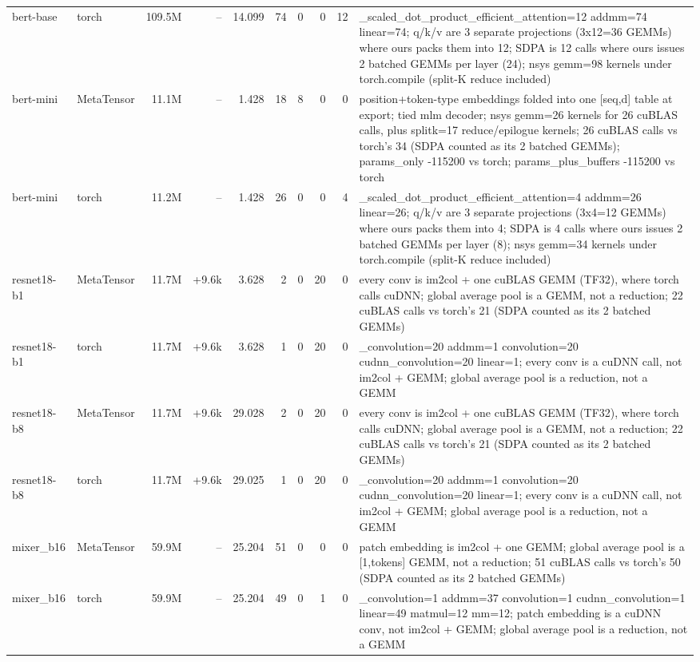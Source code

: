 \begin{tabular}{llrrrrrrrp{}}
bert-base & torch & 109.5M & -- & 14.099 & 74 & 0 & 0 & 12 & \_scaled\_dot\_product\_efficient\_attention=12 addmm=74 linear=74; q/k/v are 3 separate projections (3x12=36 GEMMs) where ours packs them into 12; SDPA is 12 calls where ours issues 2 batched GEMMs per layer (24); nsys gemm=98 kernels under torch.compile (split-K reduce included) \\
bert-mini & MetaTensor & 11.1M & -- & 1.428 & 18 & 8 & 0 & 0 & position+token-type embeddings folded into one [seq,d] table at export; tied mlm decoder; nsys gemm=26 kernels for 26 cuBLAS calls, plus splitk=17 reduce/epilogue kernels; 26 cuBLAS calls vs torch's 34 (SDPA counted as its 2 batched GEMMs); params\_only -115200 vs torch; params\_plus\_buffers -115200 vs torch \\
bert-mini & torch & 11.2M & -- & 1.428 & 26 & 0 & 0 & 4 & \_scaled\_dot\_product\_efficient\_attention=4 addmm=26 linear=26; q/k/v are 3 separate projections (3x4=12 GEMMs) where ours packs them into 4; SDPA is 4 calls where ours issues 2 batched GEMMs per layer (8); nsys gemm=34 kernels under torch.compile (split-K reduce included) \\
resnet18-b1 & MetaTensor & 11.7M & +9.6k & 3.628 & 2 & 0 & 20 & 0 & every conv is im2col + one cuBLAS GEMM (TF32), where torch calls cuDNN; global average pool is a GEMM, not a reduction; 22 cuBLAS calls vs torch's 21 (SDPA counted as its 2 batched GEMMs) \\
resnet18-b1 & torch & 11.7M & +9.6k & 3.628 & 1 & 0 & 20 & 0 & \_convolution=20 addmm=1 convolution=20 cudnn\_convolution=20 linear=1; every conv is a cuDNN call, not im2col + GEMM; global average pool is a reduction, not a GEMM \\
resnet18-b8 & MetaTensor & 11.7M & +9.6k & 29.028 & 2 & 0 & 20 & 0 & every conv is im2col + one cuBLAS GEMM (TF32), where torch calls cuDNN; global average pool is a GEMM, not a reduction; 22 cuBLAS calls vs torch's 21 (SDPA counted as its 2 batched GEMMs) \\
resnet18-b8 & torch & 11.7M & +9.6k & 29.025 & 1 & 0 & 20 & 0 & \_convolution=20 addmm=1 convolution=20 cudnn\_convolution=20 linear=1; every conv is a cuDNN call, not im2col + GEMM; global average pool is a reduction, not a GEMM \\
mixer\_b16 & MetaTensor & 59.9M & -- & 25.204 & 51 & 0 & 0 & 0 & patch embedding is im2col + one GEMM; global average pool is a [1,tokens] GEMM, not a reduction; 51 cuBLAS calls vs torch's 50 (SDPA counted as its 2 batched GEMMs) \\
mixer\_b16 & torch & 59.9M & -- & 25.204 & 49 & 0 & 1 & 0 & \_convolution=1 addmm=37 convolution=1 cudnn\_convolution=1 linear=49 matmul=12 mm=12; patch embedding is a cuDNN conv, not im2col + GEMM; global average pool is a reduction, not a GEMM \\

\end{tabular}
